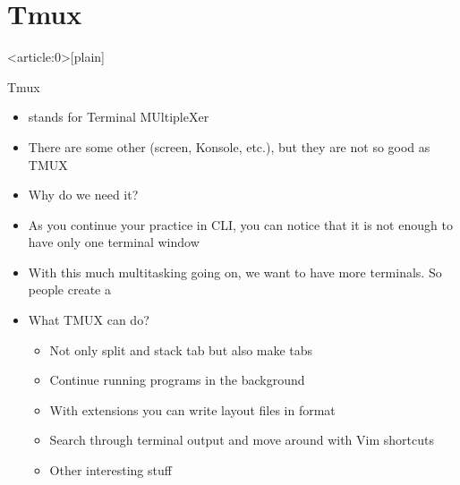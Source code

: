 \documentclass[usenames,dvipsnames,10pt,aspectratio=169]{beamer}
\begin{document}
\section{Tmux}
{ %
    \begin{frame}<article:0>[plain]
     \end{frame}
}

\begin{frame}{Tmux}
    \begin{itemize}
        \item {} stands for Terminal MUltipleXer
        \item There are some other (screen, Konsole, etc.), but they are not so good as TMUX
        \item Why do we need it?
        \item As you continue your practice in CLI, you can notice that it is not enough to have only one terminal window
        \item With this much multitasking going on, we want to have more terminals. So people create a 
        \item What TMUX can do?
        \begin{itemize}
            \item Not only split and stack tab but also make tabs
            \item Continue running programs in the background
            \item With extensions you can write layout files in  format
            \item Search through terminal output and move around with Vim shortcuts
            \item Other interesting stuff
        \end{itemize}
    \end{itemize}
\end{frame}
\end{document}

